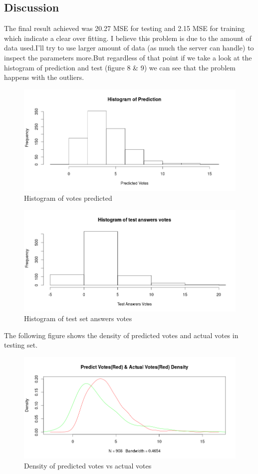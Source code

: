 \documentclass{article}
\begin{document}
\begin{multicols*}{2}
\begin{flushleft}
\section{Discussion}
The final result achieved was  20.27 MSE for testing and 2.15 MSE for training which indicate a clear over fitting. I believe this problem is due to the amount of data used.I'll try to use larger amount of data (as much the server can handle) to inspect the parameters more.But regardless of that point if we take a look at the histogram of prediction and test  (figure 8 \& 9) we can see that the problem happens with the outliers.
\begin{figure}[H]
\includegraphics[scale=0.3]{histpredict.png}
\caption{Histogram of votes predicted}
\end{figure}
\begin{figure}[H]
\includegraphics[scale=0.3]{histtest.png}
\caption{Histogram of test set answers votes}
\end{figure}
The following figure shows the density of predicted votes and actual votes in testing set.
\begin{figure}[H]
\includegraphics[scale=0.29]{density.png}
\caption{Density of predicted votes vs actual votes}
\end{figure}

\end{flushleft}
\end{multicols*}
\end{document}
